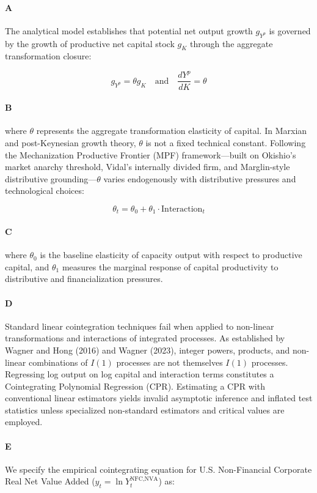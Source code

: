 \paragraph{A}
The analytical model establishes that potential net output growth $g_{Y^p}$ is governed by the growth of productive net capital stock $g_K$ through the aggregate transformation closure:

\[g_{Y^p} = \theta g_K \quad \text{and} \quad \frac{d Y^p}{d K} = \theta\]

\paragraph{B}
where $\theta$ represents the aggregate transformation elasticity of capital. In Marxian and post-Keynesian growth theory, $\theta$ is not a fixed technical constant. Following the Mechanization Productive Frontier (MPF) framework—built on Okishio's market anarchy threshold, Vidal's internally divided firm, and Marglin-style distributive grounding—$\theta$ varies endogenously with distributive pressures and technological choices:

\[\theta_t = \theta_0 + \theta_1 \cdot \text{Interaction}_t\]

\paragraph{C}
where $\theta_0$ is the baseline elasticity of capacity output with respect to productive capital, and $\theta_1$ measures the marginal response of capital productivity to distributive and financialization pressures.

\paragraph{D}
Standard linear cointegration techniques fail when applied to non-linear transformations and interactions of integrated processes. As established by Wagner and Hong (2016) and Wagner (2023), integer powers, products, and non-linear combinations of $I(1)$ processes are not themselves $I(1)$ processes. Regressing log output on log capital and interaction terms constitutes a Cointegrating Polynomial Regression (CPR). Estimating a CPR with conventional linear estimators yields invalid asymptotic inference and inflated test statistics unless specialized non-standard estimators and critical values are employed.

\paragraph{E}
We specify the empirical cointegrating equation for U.S. Non-Financial Corporate Real Net Value Added ($y_t = \ln Y_t^{\text{NFC,NVA}}$) as:

